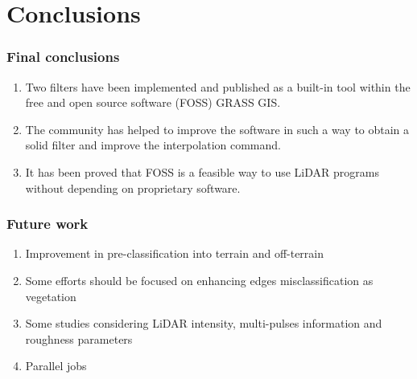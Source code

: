 \section{Conclusions}
\begin{frame}
    \frametitle{Final conclusions}
    \begin{enumerate}
     \item Two filters have been implemented and published as a built-in tool within the free and open source software (FOSS) GRASS GIS.
     \item The community has helped to improve the software in such a way to obtain a solid filter and improve the interpolation command.
     \item It has been proved that FOSS is a feasible way to use LiDAR programs without depending on proprietary software.
    \end{enumerate}
\end{frame}
\begin{frame}
    \frametitle{Future work}
    \begin{enumerate}
     \item Improvement in pre-classification into terrain and off-terrain
     \item Some efforts should be focused on enhancing edges misclassification as vegetation
     \item Some studies considering LiDAR intensity, multi-pulses information and roughness parameters
     \item Parallel jobs	
    \end{enumerate}
\end{frame}
